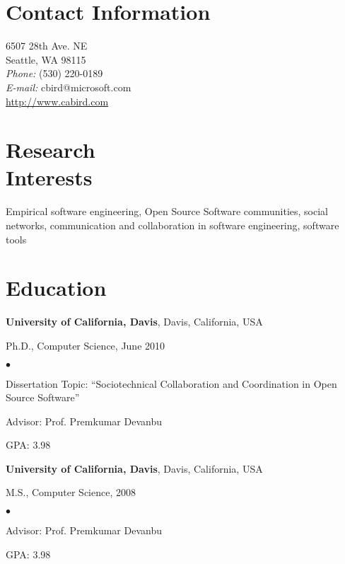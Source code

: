 \documentclass[margin,line,article,letterpaper]{res}
\newenvironment{list1}{
  \begin{list}{}{%
      \setlength{\itemsep}{0in}
      \setlength{\parsep}{0in} \setlength{\parskip}{0in}
      \setlength{\topsep}{0in} \setlength{\partopsep}{0in} 
      \setlength{\leftmargin}{0.17in}}}{\end{list}}
\newenvironment{list2}{
  \begin{list}{$\bullet$}{%
      \setlength{\itemsep}{0in}
      \setlength{\parsep}{0in} \setlength{\parskip}{0in}
      \setlength{\topsep}{0in} \setlength{\partopsep}{0in} 
      \setlength{\leftmargin}{0.2in}}}{\end{list}}
\begin{document}



\begin{resume}
\section{Contact Information}
\vspace{.05in}
6507 28th Ave. NE\\
Seattle, WA 98115\\
{\it Phone:}  (530) 220-0189 \\
{\it E-mail:}  cbird@microsoft.com\\
\url{http://www.cabird.com}
 
\section{Research \\
Interests}
Empirical software engineering, Open Source Software communities, social networks, 
communication and collaboration in software engineering, software tools

\section{Education}
\textbf{University of California, Davis}, Davis, California, USA
\begin{list1}
\item Ph.D., Computer Science, June 2010
\begin{list2}
\vspace*{.05in}
\item Dissertation Topic:  ``Sociotechnical Collaboration and Coordination in Open Source Software'' 
\item Advisor:  Prof. Premkumar Devanbu
\item GPA: 3.98
\end{list2}
\end{list1}

\textbf{University of California, Davis}, Davis, California, USA
\begin{list1}
\item M.S., Computer Science, 2008
\begin{list2}
\vspace*{.05in}
\item Advisor:  Prof. Premkumar Devanbu
\item GPA: 3.98
\end{list2}
\end{list1}


\end{resume}
\end{document}
